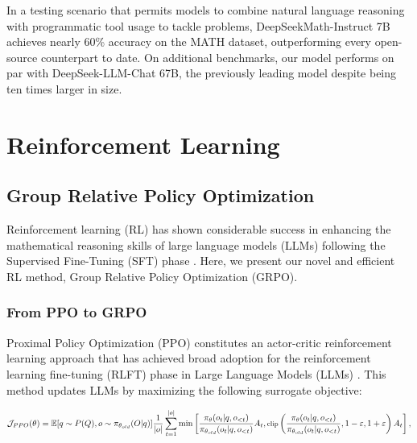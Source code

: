 \begin{itemize}[topsep=0pt]
\begin{itemize}[topsep=0pt]
In a testing scenario that permits models to combine natural language reasoning with programmatic tool usage to tackle problems, DeepSeekMath-Instruct 7B achieves nearly 60\% accuracy on the MATH dataset, outperforming every open-source counterpart to date. On additional benchmarks, our model performs on par with DeepSeek-LLM-Chat 67B, the previously leading model despite being ten times larger in size.
\section{Reinforcement Learning}

\subsection{Group Relative Policy Optimization} Reinforcement learning (RL) has shown considerable success in enhancing the mathematical reasoning skills of large language models (LLMs) following the Supervised Fine-Tuning (SFT) phase \citep{wang2023math,wizardmath}. Here, we present our novel and efficient RL method, Group Relative Policy Optimization (GRPO).

\subsubsection{From PPO to GRPO} Proximal Policy Optimization (PPO) \citep{schulman2017proximal} constitutes an actor-critic reinforcement learning approach that has achieved broad adoption for the reinforcement learning fine-tuning (RLFT) phase in Large Language Models (LLMs) \citep{ouyang2022training}. This method updates LLMs by maximizing the following surrogate objective:

\begin{equation}
\footnotesize
    \mathcal{J}_{PPO}(\theta) = \mathbb{E}{[q \sim P(Q), o \sim \pi_{\theta_{old}}(O|q)]} \frac{1}{|o|} \sum_{t=1}^{|o|} \min \left[ \frac{\pi_\theta(o_{t} | q, o_{<t})}{\pi_{\theta_{old}}(o_{t} | q, o_{<t})} A_{t}, \text{clip} \left( \frac{\pi_\theta(o_{t} | q, o_{<t})}{\pi_{\theta_{old}}(o_{t} | q, o_{<t})}, 1 - \varepsilon, 1 + \varepsilon \right)  A_{t} \right] ,
\end{equation}


\end{itemize}
\end{itemize}
